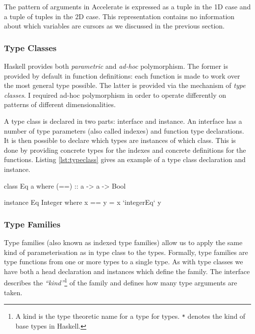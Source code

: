 \documentclass[12pt,a4paper,twoside]{scrbook}
\begin{document}
The pattern of arguments in Accelerate is expressed as a tuple in the 1D case
and a tuple of tuples in the 2D case. This representation contains no
information about which variables are cursors as we discussed in the previous
section.

\subsubsection{Type Classes}
\label{sec:typeclasses}

Haskell provides both \emph{parametric} and \emph{ad-hoc} polymorphism. The
former is provided by default in function definitions: each function is made to
work over the most general type possible. The latter is provided via the
mechanism of \emph{type classes}.  I required ad-hoc polymorphism in order to
operate differently on patterns of different dimensionalities.

A type class is declared in two parts: interface and instance. An interface has
a number of type parameters (also called indexes) and function type
declarations. It is then possible to declare which types are instances of which
class. This is done by providing concrete types for the indexes and concrete
definitions for the functions. Listing \ref{lst:typeclass} gives an example of a
type class declaration and instance.

\begin{hflisting}[label=lst:typeclass, caption={An example type class for
    equality. Showing the declaration and the instance for integers. Where
    \texttt{integerEq} is the implementation of integer equality on the target
    machine.}]

class Eq a where
  (==) :: a -> a -> Bool

instance Eq Integer where
  x == y =  x `integerEq` y

\end{hflisting}

\subsubsection{Type Families}
\label{sec:typefam}

Type families (also known as indexed type families) allow us to apply the same
kind of parameterisation as in type class to the
types\cite{jones2000}. Formally, type families are type functions from one or
more types to a single type. As with type classes we have both a head
declaration and instances which define the family. The interface describes the
\emph{``kind''}\footnote{A kind is the type theoretic name for a type for
  types. \texttt{*} denotes the kind of base types in Haskell.} of the family
and defines how many type arguments are taken.
\end{document}

